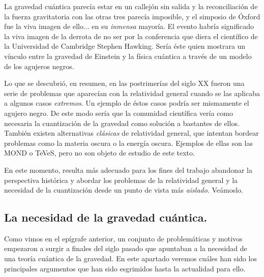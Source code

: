 \documentclass[11pt,a4paper,titlepage]{article}
\begin{document}
La gravedad cuántica parecía estar en un callejón sin salida y la reconciliación de la fuerza gravitatoria con las otras tres parecía imposible, y el simposio de Óxford fue la viva imagen de ello... en su \textit{inmensa} mayoría. El evento habría significado la viva imagen de la derrota de no ser por la conferencia que diera el científico de la Universidad de Cambridge Stephen Hawking. Sería éste quien mostrara un vínculo entre la gravedad de Einstein y la física cuántica a través de un modelo de los agujeros negros.

Lo que se descubrió, en resumen, en las postrimerías del siglo XX fueron una serie de problemas que aparecían con la relatividad general cuando se las aplicaba a algunos casos \textit{extremos}. Un ejemplo de éstos casos podría ser mismamente el agujero negro. De este modo sería que la comunidad científica vería como necesaria la cuantización de la gravedad como solución a bastantes de ellos. También existen alternativas \textit{clásicas} de relatividad general, que intentan bordear problemas como la materia oscura o la energía oscura. Ejemplos de ellas son las MOND o TeVeS, pero no son objeto de estudio de este texto.

En este momento, resulta más adecuado para los fines del trabajo abandonar la perspectiva histórica y abordar los problemas de la relatividad general y la necesidad de la cuantización desde un punto de vista más \textit{aislado}. Veámoslo.


\subsection{La necesidad de la gravedad cuántica.}
\par Como vimos en el epígrafe anterior, un conjunto de problemáticas y motivos empezaron a surgir a finales del siglo pasado que apuntaban a la necesidad de una teoría cuántica de la gravedad. En este apartado veremos cuáles han sido los principales argumentos que han sido esgrimidos hasta la actualidad para ello.
\end{document}

